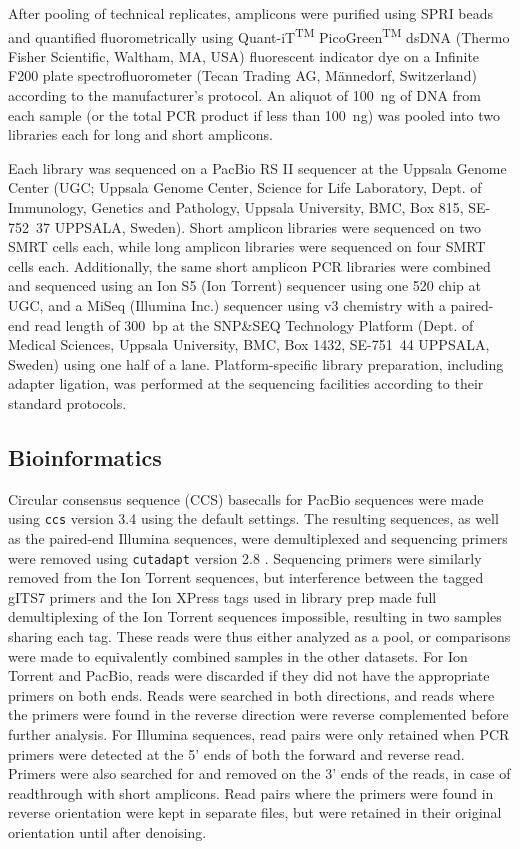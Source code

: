 \documentclass[
  12pt,
]{article}
\begin{document}
After pooling of technical replicates, amplicons were purified using SPRI beads \autocite{vesterinen2016} and quantified fluorometrically using Quant-iT\textsuperscript{TM} PicoGreen\textsuperscript{TM} dsDNA (Thermo Fisher Scientific, Waltham, MA, USA) fluorescent indicator dye on a Infinite F200 plate spectrofluorometer (Tecan Trading AG, Männedorf, Switzerland) according to the manufacturer's protocol.
An aliquot of 100~ng of DNA from each sample (or the total PCR product if less than 100~ng) was pooled into two libraries each for long and short amplicons.

Each library was sequenced on a PacBio RS II sequencer at the Uppsala Genome Center (UGC; Uppsala Genome Center, Science
for Life Laboratory, Dept. of Immunology, Genetics and Pathology, Uppsala University, BMC, Box 815, SE-752~37 UPPSALA, Sweden).
Short amplicon libraries were sequenced on two SMRT cells each, while long amplicon libraries were sequenced on four SMRT cells each.
Additionally, the same short amplicon PCR libraries were combined and sequenced using an Ion S5 (Ion Torrent) sequencer using one 520 chip at UGC, and a MiSeq (Illumina Inc.) sequencer using v3 chemistry with a paired-end read length of 300~bp at the SNP\&SEQ Technology Platform (Dept. of Medical Sciences, Uppsala University, BMC, Box 1432, SE-751~44 UPPSALA, Sweden) using one half of a lane.
Platform-specific library preparation, including adapter ligation, was performed at the sequencing facilities according to their standard protocols.

\hypertarget{bioinformatics}{%
\subsection{Bioinformatics}\label{bioinformatics}}

Circular consensus sequence (CCS) basecalls for PacBio sequences were made using \texttt{ccs} version 3.4 \autocite{pacificbiosciences2019} using the default settings.
The resulting sequences, as well as the paired-end Illumina sequences, were demultiplexed and sequencing primers were removed using \texttt{cutadapt} version 2.8 \autocite{martin2011}.
Sequencing primers were similarly removed from the Ion Torrent sequences, but interference between the tagged gITS7 primers and the Ion XPress tags used in library prep made full demultiplexing of the Ion Torrent sequences impossible, resulting in two samples sharing each tag.
These reads were thus either analyzed as a pool, or comparisons were made to equivalently combined samples in the other datasets.
For Ion Torrent and PacBio, reads were discarded if they did not have the appropriate primers on both ends.
Reads were searched in both directions, and reads where the primers were found in the reverse direction were reverse complemented before further analysis.
For Illumina sequences, read pairs were only retained when PCR primers were detected at the 5' ends of both the forward and reverse read.
Primers were also searched for and removed on the 3' ends of the reads, in case of readthrough with short amplicons.
Read pairs where the primers were found in reverse orientation were kept in separate files, but were retained in their original orientation until after denoising.
\end{document}

